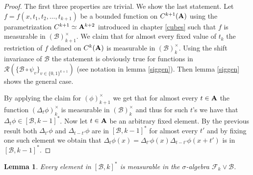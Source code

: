 \documentclass [11pt] {article}
\newtheorem{lemma}{Lemma}[section]
\newtheorem{definition}{Definition}[section]
\def\bA{{\bf A}}
\begin{document}
\begin{proof} The first three properties are trivial. We show the last statement. Let $f=f(x,t_1,t_2,\dots,t_{k+1})$ be a bounded function on $C^{k+1}(\bA)$ using the parametrization $C^{k+1}\simeq\bA^{k+2}$ introduced in chapter \ref{cubes} such that $f$ is measurable in $(\mathcal{B})_{k+1}^\times$.  We claim that for almost every fixed value of $t_k$ the restriction of $f$ defined on $C^k(\bA)$ is measurable in $(\mathcal{B})_k^\times$. 
Using the shift invariance of $\mathcal{B}$ the statement is obviously true for functions in $\mathcal{R}(\{\mathcal{B}\circ\psi_v\}_{v\in\{0,1\}^{k+1}})$ (see notation in lemma \ref{siggen}). Then lemma \ref{siggen} shows the general case. %

By applying the claim for $(\phi)_{k+1}^\times$ we get that for almost every $t\in\bA$ the function $(\Delta_t\phi)_k^\times$ is measurable in $(\mathcal{B})_k^\times$ and thus for such $t$'s we have that $\Delta_t\phi\in [\mathcal{B},k-1]^*$. Now let $t\in\bA$ be an arbitrary fixed element. By the previous result both $\Delta_{t'}\phi$ and $\Delta_{t-t'}\phi$ are in $[\mathcal{B},k-1]^*$ for almost every $t'$ and by fixing one such element we obtain that $\Delta_t\phi(x)=\Delta_{t'}\phi(x)\Delta_{t-t'}\phi(x+t')$ is in $[\mathcal{B},k-1]^*$.
\end{proof}


\begin{lemma}\label{charmes} Every element in $[\mathcal{B},k]^*$ is measurable in the $\sigma$-algebra  $\mathcal{F}_k\vee\mathcal{B}$.
\end{lemma}
\end{document}
